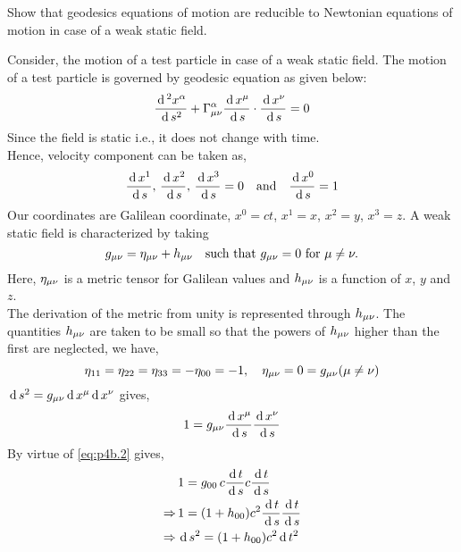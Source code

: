 \documentclass[../main-sheet.tex]{subfiles}
\begin{document}
        \begin{prob}
            Show that geodesics equations of motion are reducible to Newtonian equations of motion in case of a weak static field.
        \end{prob}
        \begin{soln}
            Consider, the motion of a test particle in case of a weak static field. The motion of a test particle is governed by geodesic equation as given below:
            \begin{equation}
                \frac{\,\mathrm{d}\,^2 x^\alpha}{\,\mathrm{d}\, s^2}+\Gamma_{\mu\nu}^\alpha \frac{\,\mathrm{d}\, x^\mu}{\,\mathrm{d}\, s}\cdot \frac{\,\mathrm{d}\, x^\nu}{\,\mathrm{d}\, s}=0\label{eq:p4b.1}
            \end{equation}
            Since the field is static i.e., it does not change with time.\\
            Hence, velocity component can be taken as,
            \begin{equation}
                \frac{\,\mathrm{d}\, x^1}{\,\mathrm{d}\, s},\,\frac{\,\mathrm{d}\, x^2}{\,\mathrm{d}\, s},\,\frac{\,\mathrm{d}\, x^3}{\,\mathrm{d}\, s}=0\quad \text{and}\quad \frac{\,\mathrm{d}\, x^0}{\,\mathrm{d}\, s}=1\label{eq:p4b.2}
            \end{equation}
            Our coordinates are Galilean coordinate, \(x^0=ct\), \(x^1=x\), \(x^2=y\), \(x^3=z\). A weak static field is characterized by taking 
            \[g_{\mu\nu}=\eta_{\mu\nu}+h_{\mu\nu}\quad\text{such that }g_{\mu\nu}=0 \text{ for }\mu\neq\nu.\]
            Here, \(\eta_{\mu\nu}\) is a metric tensor for Galilean values and \(h_{\mu\nu}\) is a function of \(x\), \(y\) and \(z\).\\
            The derivation of the metric from unity is represented through \(h_{\mu\nu}\). The quantities \(h_{\mu\nu}\) are taken to be small so that the powers of \(h_{\mu\nu}\) higher than the first are neglected, we have,
            \begin{equation}
                \eta_{11}=\eta_{22}=\eta_{33}=-\eta_{00}=-1,\quad \eta_{{\mu\nu}}=0=g_{\mu\nu}(\mu\neq\nu)\label{eq:p4b.3}
            \end{equation}
            \(\,\mathrm{d}\, s^2 =g_{{\mu\nu}}\,\mathrm{d}\, x^\mu \,\mathrm{d}\, x^\nu\) gives,
            \[1=g_{{\mu\nu}}\frac{\,\mathrm{d}\, x^\mu}{\,\mathrm{d}\, s}\frac{\,\mathrm{d}\, x^\nu}{\,\mathrm{d}\, s}\]
            By virtue of \eqref{eq:p4b.2} gives,
            \begin{align*}
                &1=g_{00}\,c\frac{\,\mathrm{d}\, t}{\,\mathrm{d}\, s}c\frac{\,\mathrm{d}\, t}{\,\mathrm{d}\, s}\\
                \Rightarrow\,&1=(1+h_{00})c^2 \frac{\,\mathrm{d}\, t}{\,\mathrm{d}\, s} \frac{\,\mathrm{d}\, t}{\,\mathrm{d}\, s}\\
                \Rightarrow\,&\,\mathrm{d}\, s^2=(1+h_{00})c^2 \,\mathrm{d}\, t^2
            \end{align*}

\end{soln}
\end{document}
